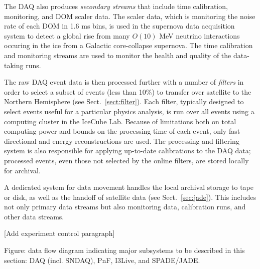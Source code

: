 The DAQ also produces \emph{secondary streams} that include time
calibration, monitoring, and DOM scaler data.  The scaler data, which is
monitoring the noise rate of each DOM in 1.6 ms bins, is used in the
supernova data acquisition system \cite{sndaq} to detect a global rise from
many $O(10)$ MeV neutrino interactions occuring in the ice from a
Galactic core-collapse supernova.  The time calibration and monitoring
streams are used to monitor the health and quality of the data-taking runs.

The raw DAQ event data is then processed further with a number of
\emph{filters} in order to select a subset of events (less than 10\%) to
transfer over satellite to the Northern Hemisphere (see
Sect.~\ref{sect:filter}).  Each 
filter, typically designed to select events useful for a particular physics
analysis, is run 
over all events using a computing cluster in the IceCube Lab.  Because of
limitations both on total computing power and bounds on the processing time
of each event, only fast directional and energy reconstructions are used.
The processing and filtering system is also responsible for applying
up-to-date calibrations to the DAQ data; processed events, even those not
selected by the online filters, are stored locally for archival.

A dedicated system for data movement handles the local archival storage to
tape or disk, as well as the handoff of satellite data (see Sect.~\ref{sec:jade}).
This includes not only primary data streams but also monitoring data,
calibration runs, and other data streams.

[Add experiment control paragraph]



Figure: data flow diagram indicating major subsystems to be described in
this section: DAQ (incl. SNDAQ), PnF, I3Live, and SPADE/JADE.

